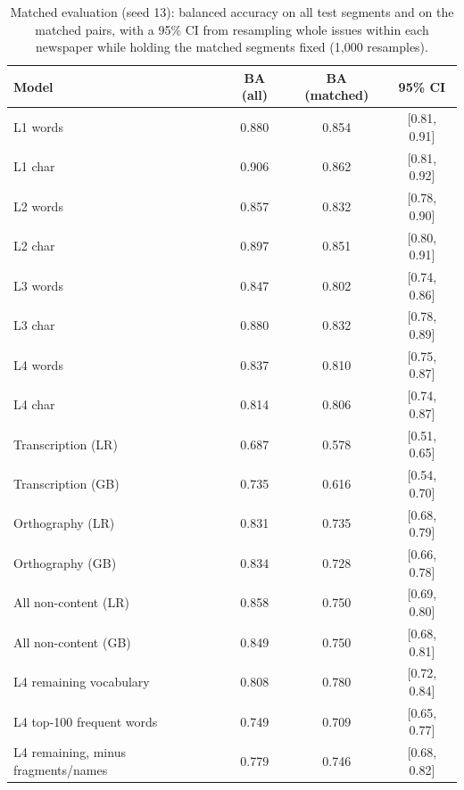 \begin{table}[h]\centering\small\caption{Matched evaluation (seed 13): balanced accuracy on all test segments and on the matched pairs, with a 95\% CI from resampling whole issues within each newspaper while holding the matched segments fixed (1{,}000 resamples).}
\begin{tabular}{@{}lccc@{}}\toprule Model & BA (all) & BA (matched) & 95\% CI \\ \midrule
L1 words & 0.880 & 0.854 & [0.81, 0.91] \\
L1 char & 0.906 & 0.862 & [0.81, 0.92] \\
L2 words & 0.857 & 0.832 & [0.78, 0.90] \\
L2 char & 0.897 & 0.851 & [0.80, 0.91] \\
L3 words & 0.847 & 0.802 & [0.74, 0.86] \\
L3 char & 0.880 & 0.832 & [0.78, 0.89] \\
L4 words & 0.837 & 0.810 & [0.75, 0.87] \\
L4 char & 0.814 & 0.806 & [0.74, 0.87] \\
Transcription (LR) & 0.687 & 0.578 & [0.51, 0.65] \\
Transcription (GB) & 0.735 & 0.616 & [0.54, 0.70] \\
Orthography (LR) & 0.831 & 0.735 & [0.68, 0.79] \\
Orthography (GB) & 0.834 & 0.728 & [0.66, 0.78] \\
All non-content (LR) & 0.858 & 0.750 & [0.69, 0.80] \\
All non-content (GB) & 0.849 & 0.750 & [0.68, 0.81] \\
L4 remaining vocabulary & 0.808 & 0.780 & [0.72, 0.84] \\
L4 top-100 frequent words & 0.749 & 0.709 & [0.65, 0.77] \\
L4 remaining, minus fragments/names & 0.779 & 0.746 & [0.68, 0.82] \\
\bottomrule\end{tabular}\label{tab:matched}\end{table}
